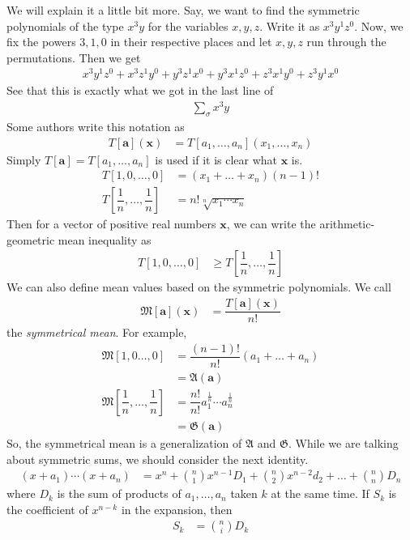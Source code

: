 \documentclass{subfile}
\begin{document}
	We will explain it a little bit more. Say, we want to find the symmetric polynomials of the type $x^{3}y$ for the variables $x,y,z$. Write it as $x^{3}y^{1}z^{0}$. Now, we fix the powers $3,1,0$ in their respective places and let $x,y,z$ run through the permutations. Then we get
		\begin{align*}
			x^{3}y^{1}z^{0}+x^{3}z^{1}y^{0}+y^{3}z^{1}x^{0}+y^{3}x^{1}z^{0}+z^{3}x^{1}y^{0}+z^{3}y^{1}x^{0}
		\end{align*}
	See that this is exactly what we got in the last line of
		\begin{align*}
			\sum_{\sigma}x^{3}y
		\end{align*}
	Some authors write this notation as
		\begin{align*}
			T[\mathbf{a}](\mathbf{x})
				& = T[a_{1},\ldots,a_{n}](x_{1},\ldots,x_{n})
		\end{align*}
	Simply $T[\mathbf{a}]=T[a_{1},\ldots,a_{n}]$ is used if it is clear what $\mathbf{x}$ is.
		\begin{align*}
			T[1,0,\ldots,0]
				& = (x_{1}+\ldots+x_{n})(n-1)!\\
			T\left[\dfrac{1}{n},\ldots,\dfrac{1}{n}\right]
				& = n!\sqrt[n]{x_{1}\cdots x_{n}}
		\end{align*}
	Then for a vector of positive real numbers $\mathbf{x}$, we can write the arithmetic-geometric mean inequality as
		\begin{align*}
			T[1,0,\ldots,0]
				& \geq T\left[\dfrac{1}{n},\ldots,\dfrac{1}{n}\right]
		\end{align*}
	We can also define mean values based on the symmetric polynomials. We call
		\begin{align*}
			\mathfrak{M}[\mathbf{a}](\mathbf{x})
				& = \dfrac{T[\mathbf{a}](\mathbf{x})}{n!}
		\end{align*}
	the \textit{symmetrical mean}. For example,
		\begin{align*}
			\mathfrak{M}[1,0\ldots,0]
				& = \dfrac{(n-1)!}{n!}(a_{1}+\ldots+a_{n})\\
				& = \mathfrak{A}(\mathbf{a})\\
			\mathfrak{M}\left[\dfrac{1}{n},\ldots,\dfrac{1}{n}\right]
				& = \dfrac{n!}{n!}a_{1}^{\frac{1}{n}}\cdots a_{n}^{\frac{1}{n}}\\
				& = \mathfrak{G}(\mathbf{a})
		\end{align*}
	So, the symmetrical mean is a generalization of $\mathfrak{A}$ and $\mathfrak{G}$. While we are talking about symmetric sums, we should consider the next identity.
		\begin{align*}
			(x+a_{1})\cdots(x+a_{n})
				& = x^{n}+\binom{n}{1}x^{n-1}D_{1}+\binom{n}{2}x^{n-2}d_{2}+\ldots+\binom{n}{n}D_{n}
		\end{align*}
	where $D_{k}$ is the sum of products of $a_{1},\ldots,a_{n}$ taken $k$ at the same time. If $S_{k}$ is the coefficient of $x^{n-k}$ in the expansion, then
		\begin{align*}
			S_{k}
				& = \binom{n}{i}D_{k}
		\end{align*}
\end{document}
